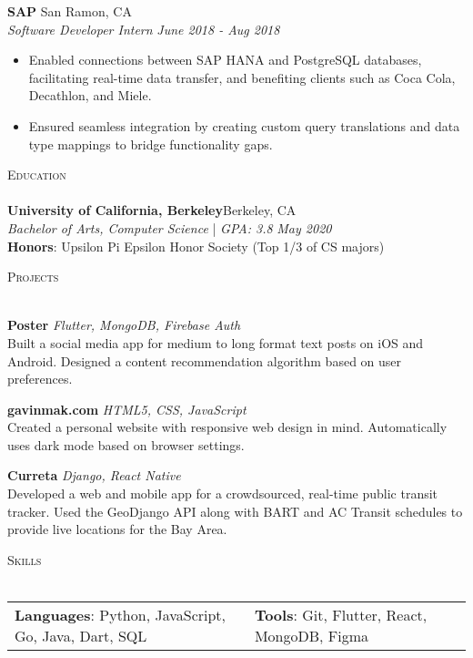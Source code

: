 \documentclass[a4paper]{article}
\newcommand{\lineunder} {
    \vspace*{-8pt} \\
    \hspace*{-2pt} \hrulefill \\
}
\newcommand{\header} [1] {
    {\hspace*{-2pt}\vspace*{6pt} \textsc{#1}}
    \vspace*{-6pt} \lineunder
}
\begin{document}
\textbf{SAP} \hfill San Ramon, CA\\
\vspace{1mm}
\textit{Software Developer Intern} \hfill \textit{June 2018 - Aug 2018}\\
\vspace{-1mm}
\begin{itemize} \itemsep 1pt
	\item Enabled connections between SAP HANA and PostgreSQL databases, facilitating real-time data transfer, and benefiting clients such as Coca Cola, Decathlon, and Miele.
	\item Ensured seamless integration by creating custom query translations and data type mappings to bridge functionality gaps.
\end{itemize}
\vspace{4mm}


\header{{\large Education}}
\vspace{2mm}
\textbf{University of California, Berkeley}\hfill Berkeley, CA\\
\vspace{1mm}
\textit{Bachelor of Arts, Computer Science} | \textit{GPA: 3.8} \hfill \textit{May 2020}\\
\vspace{2mm}
\textbf{Honors}: Upsilon Pi Epsilon Honor Society (Top 1/3 of CS majors)\\
\vspace{6mm}


\header{{\large Projects}}
\vspace{2mm}

{\textbf{Poster}} \hfill {\sl Flutter, MongoDB, Firebase Auth} \\
\vspace{1mm}
Built a social media app for medium to long format text posts on iOS and Android. Designed a content recommendation algorithm based on user preferences. \\
\vspace*{2mm}

{\textbf{gavinmak.com}} \hfill {\sl HTML5, CSS, JavaScript} \\
\vspace{1mm}
Created a personal website with responsive web design in mind. Automatically uses dark mode based on browser settings.\\
\vspace*{2mm}

{\textbf{Curreta}} \hfill {\sl Django, React Native} \\
\vspace{1mm}
Developed a web and mobile app for a crowdsourced, real-time public transit tracker. Used the GeoDjango API along with BART and AC Transit schedules to provide live locations for the Bay Area.\\
\vspace*{2mm}

\vspace*{4mm}


\header{{\large Skills}}
\vspace{2mm}

\begin{tabular}{@{}lll@{}}
	{\textbf{Languages}}:  Python, JavaScript, Go, Java, Dart, SQL & {\textbf{Tools}}: Git, Flutter, React, MongoDB, Figma \\
\end{tabular}
\end{document}

